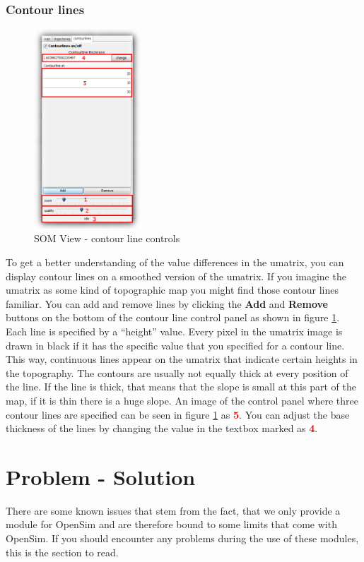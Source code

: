 \documentclass[a4paper]{scrartcl}
\newcommand{\imagenumber}[1]{\textcolor{red}{\textbf{#1}}}
\begin{document}
\subsubsection{Contour lines}
\begin{figure}
\begin{center}
\includegraphics[width=4cm]{graphics/somview_contourlines.png}
\end{center}
\caption{SOM View - contour line controls}
\label{fig:controls-trajectories}
\end{figure}
To get a better understanding of the value differences in the umatrix, you can display contour lines on a smoothed version of the umatrix. If you imagine the umatrix as some kind of topographic map you might find those contour lines familiar.
You can add and remove lines by clicking the \textbf{Add} and \textbf{Remove} buttons on the bottom of the contour line control panel as shown in figure \ref{fig:controls-trajectories}.
Each line is specified by a ``height'' value. Every pixel in the umatrix image is drawn in black if it has the specific value that you specified for a contour line. This way, continuous lines appear on the umatrix that indicate certain heights in the topography. The contours are usually not equally thick at every position of the line. If the line is thick, that means that the slope is small at this part of the map, if it is thin there is a huge slope. An image of the control panel where three contour lines are specified can be seen in figure \ref{fig:controls-trajectories} as \imagenumber{5}.
You can adjust the base thickness of the lines by changing the value in the textbox marked as \imagenumber{4}.

\section{Problem - Solution}
There are some known issues that stem from the fact, that we only provide a module for OpenSim and are therefore bound to some limits that come with OpenSim. If you should encounter any problems during the use of these modules, this is the section to read.
\end{document}
